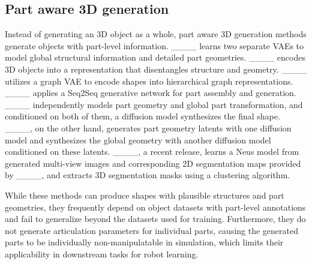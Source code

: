 \subsection{Part aware 3D generation} Instead of generating an 3D object as a whole, part aware 3D generation methods generate objects with part-level information. ____ learns two separate VAEs to model global structural information and detailed part geometries. ____ encodes 3D objects into a representation that disentangles structure and geometry. ____ utilizes a graph VAE to encode shapes into hierarchical graph representations. ____ applies a Seq2Seq generative network for part assembly and generation. ____ independently models part geometry and global part transformation, and conditioned on both of them, a diffusion model synthesizes the final shape. ____, on the other hand, generates part geometry latents with one diffusion model and synthesizes the global geometry with another diffusion model conditioned on these latents. ____, a recent release, learns a Neus model from generated multi-view images and corresponding 2D segmentation maps provided by ____, and extracts 3D segmentation masks using a clustering algorithm.

While these methods can produce shapes with plausible structures and part geometries, they frequently depend on object datasets with part-level annotations and fail to generalize beyond the datasets used for training. Furthermore, they do not generate articulation parameters for individual parts, causing the generated parts to be individually non-manipulatable in simulation, which limits their applicability in downstream tasks for robot learning.